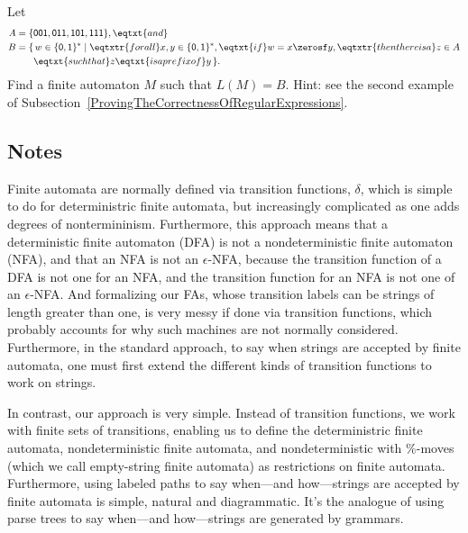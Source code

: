 \begin{exercise}
Let
\begin{align*}
A &=\{\mathsf{001, 011, 101, 111}\} , \eqtxt{and} \\
B &=\{\,w\in\{\mathsf{0,1}\}^* \mid \eqtxtr{for all}x,y\in\{\mathsf{0,1}\}^*,
\eqtxt{if}w=x\zerosf y, \eqtxtr{then there is a} z\in A \\
&\quad\;\;\; \eqtxt{such that} z\eqtxt{is a prefix of} y\,\}.
\end{align*}
Find a finite automaton $M$ such that $L(M)=B$.  Hint: see the second
example of Subsection~\ref{ProvingTheCorrectnessOfRegularExpressions}.
\end{exercise}

\subsection{Notes}

Finite automata are normally defined via transition functions,
$\delta$, which is simple to do for deterministric finite automata,
but increasingly complicated as one adds degrees of nontermininism.
Furthermore, this approach means that a deterministic finite automaton
(DFA) is not a nondeterministic finite automaton (NFA), and that an
NFA is not an $\epsilon$-NFA, because the transition function of a DFA
is not one for an NFA, and the transition function for an NFA is not
one of an $\epsilon$-NFA.  And formalizing our FAs, whose transition
labels can be strings of length greater than one, is very messy if
done via transition functions, which probably accounts for why such
machines are not normally considered.  Furthermore, in the standard
approach, to say when strings are accepted by finite automata, one must
first extend the different kinds of transition functions to work on
strings.

In contrast, our approach is very simple.  Instead of transition
functions, we work with finite sets of transitions, enabling us to
define the deterministric finite automata, nondeterministic finite
automata, and nondeterministic with $\%$-moves (which we call
empty-string finite automata) as restrictions on finite automata.
Furthermore, using labeled paths to say when---and how---strings are
accepted by finite automata is simple, natural and diagrammatic.  It's
the analogue of using parse trees to say when---and how---strings are
generated by grammars.

